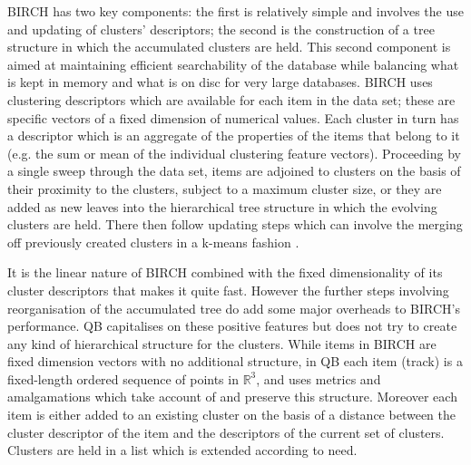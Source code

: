 \documentclass[preprint,authoryear,a4paper,10pt,onecolumn]{elsarticle}
\begin{document}
BIRCH has two key components: the first is relatively simple and involves
the use and updating of clusters' descriptors; the second is the
construction of a tree structure in which the accumulated clusters are
held. This second component is aimed at maintaining efficient
searchability of the database while balancing what is kept in memory and
what is on disc for very large databases. BIRCH uses clustering
descriptors which are available for each item in the data set; these are
specific vectors of a fixed dimension of numerical values. Each cluster
in turn has a descriptor which is an aggregate of the properties of the
items that belong to it (e.g. the sum or mean of the individual
clustering feature vectors). Proceeding by a single sweep through the
data set, items are adjoined to clusters on the basis of their proximity
to the clusters, subject to a maximum cluster size, or they are added as
new leaves into the hierarchical tree structure in which the evolving
clusters are held. There then follow updating steps which can involve
the merging off previously created clusters in a k-means
fashion \citep{steinhaus1956division, macqueen1967some}.

It is the linear nature of BIRCH combined with the fixed dimensionality
of its cluster descriptors that makes it quite fast. However the further
steps involving reorganisation of the accumulated tree do add some major
overheads to BIRCH's performance. QB capitalises on these positive
features but does not try to create any kind of hierarchical structure
for the clusters. While items in BIRCH are fixed dimension vectors with
no additional structure, in QB each item (track) is a fixed-length
ordered sequence of points in $\mathbb{R}^{3}$, and uses metrics and
amalgamations which take account of and preserve this structure.
Moreover each item is either added to an existing cluster on the basis
of a distance between the cluster descriptor of the item and the
descriptors of the current set of clusters. Clusters are held in a list
which is extended according to need.
\end{document}
